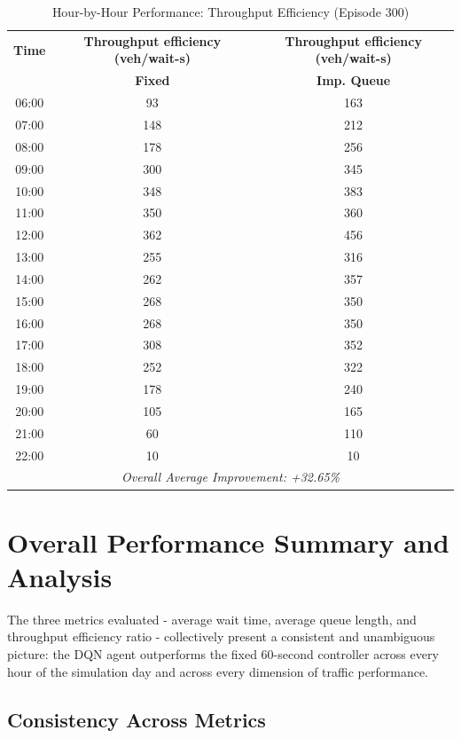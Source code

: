 \begin{table}[H]
\centering
\caption{Hour-by-Hour Performance: Throughput Efficiency (Episode 300)}
\label{tab:throughput_comparison}
\small
\begin{tabular}{|c|c|c|}
\hline
\textbf{Time} & \textbf{Throughput efficiency (veh/wait-s)} & \textbf{Throughput efficiency (veh/wait-s)} \\
 & \textbf{Fixed} & \textbf{Imp. Queue} \\
\hline
06:00 & 93 & 163 \\
07:00 & 148 & 212 \\
08:00 & 178 & 256 \\
09:00 & 300 & 345 \\
10:00 & 348 & 383 \\
11:00 & 350 & 360 \\
12:00 & 362 & 456 \\
13:00 & 255 & 316 \\
14:00 & 262 & 357 \\
15:00 & 268 & 350 \\
16:00 & 268 & 350 \\
17:00 & 308 & 352 \\
18:00 & 252 & 322 \\
19:00 & 178 & 240 \\
20:00 & 105 & 165 \\
21:00 & 60 & 110 \\
22:00 & 10 & 10 \\
\hline
\multicolumn{3}{|c|}{\textit{Overall Average Improvement: +32.65\%}} \\
\hline
\end{tabular}
\end{table}



\section{Overall Performance Summary and Analysis}
\label{sec:overall_performance_summary}

The three metrics evaluated - average wait time, average queue length,
and throughput efficiency ratio - collectively present a consistent and
unambiguous picture: the DQN agent outperforms the fixed 60-second
controller across every hour of the simulation day and across every
dimension of traffic performance.

\subsection{Consistency Across Metrics}
\label{subsec:consistency_across_metrics}

